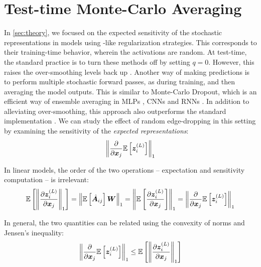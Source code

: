 
\section{Test-time Monte-Carlo Averaging}

In \autoref{sec:theory}, we focused on the expected sensitivity of the stochastic representations in models using -like regularization strategies. This corresponds to their training-time behavior, wherein the activations are random. At test-time, the standard practice is to turn these methods off by setting $q=0$. However, this raises the over-smoothing levels back up \cite{xuanyuan2023shedding}. Another way of making predictions is to perform multiple stochastic forward passes, as during training, and then averaging the model outputs. This is similar to Monte-Carlo Dropout, which is an efficient way of ensemble averaging in MLPs \cite{gal2016mcd}, CNNs \cite{gal2016bayesianconvolutionalneuralnetworks} and RNNs \cite{gal2016rnn}. In addition to alleviating over-smoothing, this approach also outperforms the standard implementation \cite{xuanyuan2023shedding}. We can study the effect of random edge-dropping in this setting by examining the sensitivity of the \textit{expected representations}:
$$
    \left\|\frac{\partial}{\partial \bm{x}_j} \mathbb{E} \left[\bm{z}^{\left(L\right)}_i\right]\right\|_1
$$

In linear models, the order of the two operations -- expectation and sensitivity computation -- is irrelevant:
\begin{align}
    \mathbb{E} \left[\left\|\frac{\partial \bm{z}^{\left(L\right)}_i}{\partial \bm{x}_j}\right\|_1\right] 
    = \left\|\mathbb{E} \left[\hat{\bm{A}}_{ij}\right]\bm{W}\right\|_1
    = \left\|\mathbb{E} \left[\frac{\partial \bm{z}^{\left(L\right)}_i}{\partial \bm{x}_j}\right]\right\|_1
    = \left\|\frac{\partial}{\partial \bm{x}_j} \mathbb{E} \left[\bm{z}^{\left(L\right)}_i\right]\right\|_1
\end{align}

In general, the two quantities can be related using the convexity of norms and Jensen's inequality:
\begin{align}
    \left\|\frac{\partial}{\partial \bm{x}_j} \mathbb{E} \left[\bm{z}^{\left(L\right)}_i\right]\right\|_1
    \leq
    \mathbb{E} \left[\left\|\frac{\partial \bm{z}^{\left(L\right)}_i}{\partial \bm{x}_j}\right\|_1\right]
\end{align}


